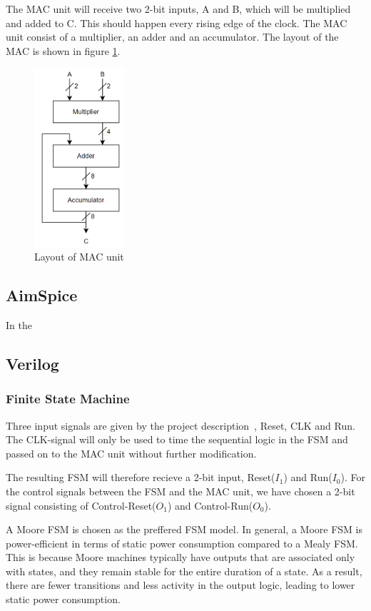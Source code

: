 The MAC unit will receive two 2-bit inputs, A and B, which will be multiplied and added to C. This should happen every rising edge of the clock. The MAC unit consist of a multiplier, an adder and an accumulator. The layout of the MAC is shown in figure \ref{fig:mac-blokk}. 
\begin{figure}[htpb]
    \centering
    \includegraphics[width=0.3\textwidth]{Figures/mac-blokk.png}
    \caption{Layout of MAC unit}
    \label{fig:mac-blokk}
\end{figure}

\subsection{AimSpice}
In the 


\subsection{Verilog}


\subsubsection{Finite State Machine}
\label{subsec:fsm_}

Three input signals are given by the project description~\cite{project_description}, Reset, CLK and Run. The CLK-signal will only be used to time the sequential logic in the FSM and passed on to the MAC unit without further modification.

The resulting FSM will therefore recieve a 2-bit input, Reset($I_1$) and Run($I_0$). For the control signals between the FSM and the MAC unit, we have chosen a 2-bit signal consisting of Control-Reset($O_1$) and Control-Run($O_0$). 

A Moore FSM is chosen as the preffered FSM model. In general, a Moore FSM is power-efficient in terms of static power consumption compared to a Mealy FSM. This is because Moore machines typically have outputs that are associated only with states, and they remain stable for the entire duration of a state. As a result, there are fewer transitions and less activity in the output logic, leading to lower static power consumption.

